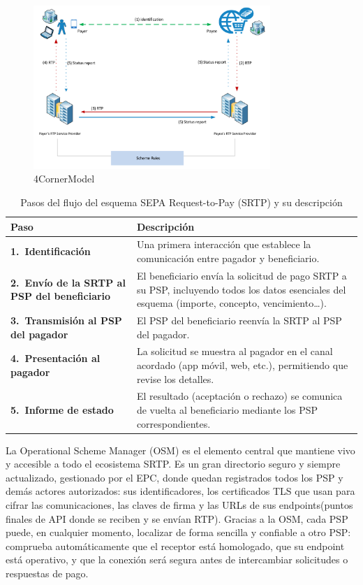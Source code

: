 \begin{figure}[H]
  \centering
  \includegraphics[width=0.8\textwidth]{Imagenes/4CornerModel.png}
  \caption{4CornerModel}
  \label{fig:4corner}
\end{figure}

\begin{table}[htbp]
  \centering
  \renewcommand{\arraystretch}{1.2} %
  \caption{Pasos del flujo del esquema SEPA Request-to-Pay (SRTP) y su descripción}
  \label{tab:srtp-steps-a}
  \begin{tabularx}{\textwidth}{@{} >{\bfseries}l  X @{}}
    \toprule
    Paso  & Descripción \\
    \midrule
    1.\ Identificación
      & Una primera interacción que establece la comunicación entre pagador y beneficiario. \\
    2.\ Envío de la SRTP al PSP del beneficiario
      & El beneficiario envía la solicitud de pago SRTP a su PSP, incluyendo todos los datos esenciales del esquema (importe, concepto, vencimiento…). \\
    3.\ Transmisión al PSP del pagador
      & El PSP del beneficiario reenvía la SRTP al PSP del pagador. \\
    4.\ Presentación al pagador
      & La solicitud se muestra al pagador en el canal acordado (app móvil, web, etc.), permitiendo que revise los detalles. \\
    5.\ Informe de estado
      & El resultado (aceptación o rechazo) se comunica de vuelta al beneficiario mediante los PSP correspondientes. \\
    \bottomrule
  \end{tabularx}
\end{table}

La Operational Scheme Manager (OSM) es el elemento central que mantiene vivo y accesible a todo el ecosistema SRTP. Es un gran directorio seguro y siempre actualizado, gestionado por el EPC, donde quedan registrados todos los PSP y demás actores autorizados: sus identificadores, los certificados TLS que usan para cifrar las comunicaciones, las claves de firma y las URLs de sus endpoints(puntos finales de API donde se reciben y se envían RTP). Gracias a la OSM, cada PSP puede, en cualquier momento, localizar de forma sencilla y confiable a otro PSP: comprueba automáticamente que el receptor está homologado, que su endpoint está operativo, y que la conexión será segura antes de intercambiar solicitudes o respuestas de pago.

